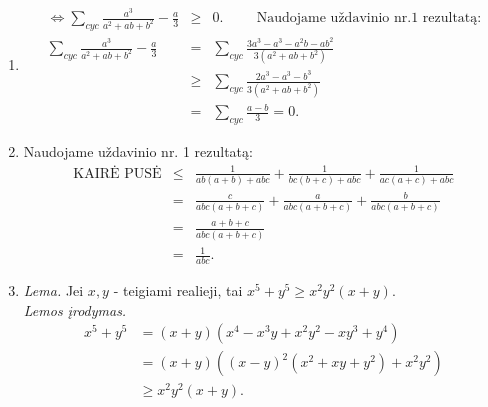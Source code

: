 \begin{enumerate}
\begin{equation*}
\begin{array}{ll}
    x+y+z-k=0, & \end{array} \right. \Rightarrow \left\{ \begin{array}{ll}
    d+e=a, &  \\ d+f=b, &  \\ e+f=c, &  \\ d+e+f=k, & \end{array}
    \right.\tag{2}\end{equation*} Iš (1) ir (2) sudarę bendrą sistemą ir
    ją išsprendę gausime $a=4$, $b=5$, $c=7$, $d=1$, $e=3$, $f=4$, $k=8$,
    o $a^2+b^2+c^+d^2+e^2+f^2+k^2=244$. Taigi,
    $E=(x+y-4)^2+(x+z-5)^2+(y+z-7)^2+(x-1)^2+(y-3)^2+(z-4)^2+2(x+y+z-8)^2-244+\Psi\geq
    \Psi-244.$ Vadinasi, $E$ minimumas yra $\Psi-244$, o jis pasiekiamas,
    kai $x=1$, $y=3$, $z=4$.
\item
    \begin{eqnarray*} \Leftrightarrow
    \sum_{cyc}{\frac{a^3}{a^2+ab+b^2}-\frac{a}{3}}&\geq& 0. \hspace{1cm}
    \mbox{Naudojame uždavinio nr.1 rezultatą:}\\
    \sum_{cyc}{\frac{a^3}{a^2+ab+b^2}-\frac{a}{3}}&=&\sum_{cyc}{\frac{3a^3-a^3-a^2b-ab^2}{3(a^2+ab+b^2)}}\\
    &\geq&\sum_{cyc}{\frac{2a^3-a^3-b^3}{3(a^2+ab+b^2)}}\\ &=&
    \sum_{cyc}{\frac{a-b}{3}}=0. \end{eqnarray*}
\item
    Naudojame uždavinio nr. 1 rezultatą: \begin{eqnarray*} \mbox{KAIRĖ
    PUSĖ}&\leq&\frac{1}{ab(a+b)+abc}+\frac{1}{bc(b+c)+abc}+\frac{1}{ac(a+c)+abc}\\
    &=&\frac{c}{abc(a+b+c)}+\frac{a}{abc(a+b+c)}+\frac{b}{abc(a+b+c)}\\
    &=&\frac{a+b+c}{abc(a+b+c)}\\ &=&\frac{1}{abc}. \end{eqnarray*}
\item
    \textit{Lema.} Jei $x,y$ - teigiami realieji, tai $x^5+y^5\geq
    x^2y^2(x+y)$.\\ \noindent\textit{Lemos įrodymas.}
    \begin{align*}
     x^5+y^5 &=(x+y)(x^4-x^3y+x^2y^2-xy^3+y^4)\\
             &=(x+y)((x-y)^2(x^2+xy+y^2)+x^2y^2) \\
             &\geq x^2y^2(x+y).
    \end{align*}
    

\end{enumerate}
